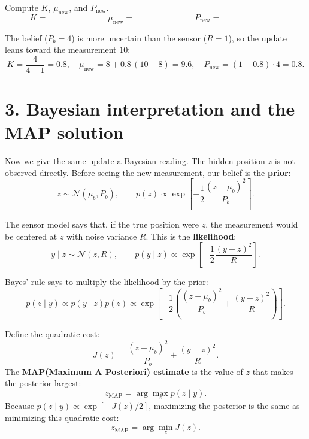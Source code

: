 \documentclass[11pt]{article}
\begin{document}
\begin{enumerate}
  \vspace{2.0em}

  Compute $K$, $\mu_{\text{new}}$, and $P_{\text{new}}$.
  \[
  K =
  \hspace{3cm}
  \mu_{\text{new}} =
  \hspace{3cm}
  P_{\text{new}} =
  \hspace{3cm}
  \]

  \vspace{2.0em}

  \begin{solution}
  The belief ($P_b=4$) is more uncertain than the sensor ($R=1$), so the update
  leans toward the measurement $10$:
  \[
  K=\frac{4}{4+1}=0.8,\quad
  \mu_{\text{new}}=8+0.8\,(10-8)=9.6,\quad
  P_{\text{new}}=(1-0.8)\cdot4=0.8.
  \]
  \end{solution}

\end{enumerate}

\newpage

\section*{3. Bayesian interpretation and the MAP solution}

Now we give the same update a Bayesian reading. The hidden position $z$ is not
observed directly. Before seeing the new measurement, our belief is the
\textbf{prior}:
\[
z \sim \mathcal{N}(\mu_b,P_b),
\qquad
p(z)\propto
\exp\left[-\frac{1}{2}\frac{(z-\mu_b)^2}{P_b}\right].
\]

The sensor model says that, if the true position were $z$, the measurement
would be centered at $z$ with noise variance $R$. This is the
\textbf{likelihood}:
\[
y\mid z \sim \mathcal{N}(z,R),
\qquad
p(y\mid z)\propto
\exp\left[-\frac{1}{2}\frac{(y-z)^2}{R}\right].
\]

Bayes' rule says to multiply the likelihood by the prior:
\[
p(z \mid y)
\propto
p(y\mid z)p(z)
\propto
\exp\left[
-\frac{1}{2}
\left(
\frac{(z-\mu_b)^2}{P_b}
+
\frac{(y-z)^2}{R}
\right)
\right].
\]

Define the quadratic cost:
\[
J(z)=
\frac{(z-\mu_b)^2}{P_b}
+
\frac{(y-z)^2}{R}.
\]
The \textbf{MAP(Maximum A Posteriori) estimate} is the value of $z$ that makes the posterior largest:
\[
z_{\mathrm{MAP}}=\arg\max_z p(z\mid y).
\]
Because $p(z\mid y)\propto \exp[-J(z)/2]$, maximizing the posterior is the same
as minimizing this quadratic cost:
\[
z_{\mathrm{MAP}}=\arg\min_z J(z).
\]
\end{document}

